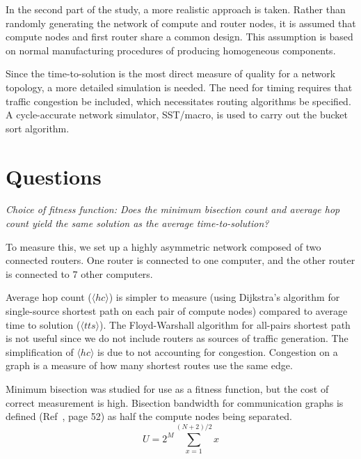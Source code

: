 \documentclass[pdftex]{article}
\begin{document}
In the second part of the study, a more realistic approach is taken. Rather than randomly generating the network of compute and router nodes, it is assumed that compute nodes and first router share a common design. This assumption is based on normal manufacturing procedures of producing homogeneous components. 

Since the time-to-solution is the most direct measure of quality for a network topology, a more detailed simulation is needed. The need for timing requires that traffic congestion be included, which necessitates routing algorithms be specified. A cycle-accurate network simulator, SST/macro, is used to carry out the bucket sort algorithm. 



\section{Questions}

\textit{Choice of fitness function: Does the minimum bisection count and average hop count yield the same solution as the average time-to-solution?}

To measure this, we set up a highly asymmetric network composed of two connected routers. One router is connected to one computer, and the other router is connected to 7 other computers. 

Average hop count ($\langle hc \rangle$) is simpler to measure (using Dijkstra's algorithm for single-source shortest path on each pair of compute nodes) compared to average time to solution ($\langle tts \rangle$). The Floyd-Warshall algorithm for all-pairs shortest path is not useful since we do not include routers as sources of traffic generation. The simplification of $\langle hc \rangle$ is due to not accounting for congestion. Congestion on a graph is a measure of how many shortest routes use the same edge.

Minimum bisection was studied for use as a fitness function, but the cost of correct measurement is high. Bisection bandwidth for communication graphs is defined (Ref~\cite{1980_Thompson}, page 52) as half the compute nodes being separated.
\begin{equation}
 U = 2^M \sum_{x=1}^{(N+2)/2}x
\end{equation}
\end{document}

